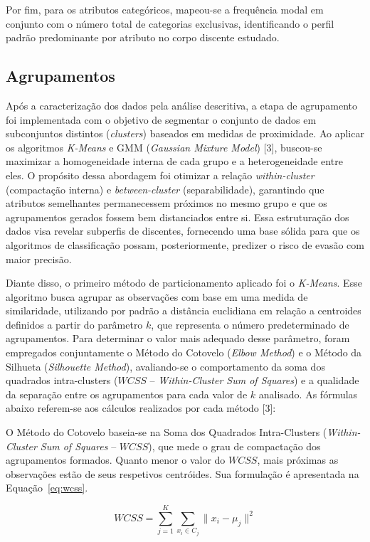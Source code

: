 Por fim, para os atributos categóricos, mapeou-se a frequência modal em conjunto com o número total de categorias exclusivas, identificando o perfil padrão predominante por atributo no corpo discente estudado.

\subsection{Agrupamentos}
Após a caracterização dos dados pela análise descritiva, a etapa de agrupamento foi implementada com o objetivo de segmentar o conjunto de dados em subconjuntos distintos (\textit{clusters}) baseados em medidas de proximidade. Ao aplicar os algoritmos \textit{K-Means} e GMM (\textit{Gaussian Mixture Model}) [3], buscou-se maximizar a homogeneidade interna de cada grupo e a heterogeneidade entre eles. O propósito dessa abordagem foi otimizar a relação \textit{within-cluster} (compactação interna) e \textit{between-cluster} (separabilidade), garantindo que atributos semelhantes permanecessem próximos no mesmo grupo e que os agrupamentos gerados fossem bem distanciados entre si. Essa estruturação dos dados visa revelar subperfis de discentes, fornecendo uma base sólida para que os algoritmos de classificação possam, posteriormente, predizer o risco de evasão com maior precisão.

Diante disso, o primeiro método de particionamento aplicado foi o \textit{K-Means}. Esse algoritmo busca agrupar as observações com base em uma medida de similaridade, utilizando por padrão a distância euclidiana em relação a centroides definidos a partir do parâmetro $k$, que representa o número predeterminado de agrupamentos. Para determinar o valor mais adequado desse parâmetro, foram empregados conjuntamente o Método do Cotovelo (\textit{Elbow Method}) e o Método da Silhueta (\textit{Silhouette Method}), avaliando-se o comportamento da soma dos quadrados intra-clusters ($WCSS$ -- \textit{Within-Cluster Sum of Squares}) e a qualidade da separação entre os agrupamentos para cada valor de $k$ analisado. As fórmulas abaixo referem-se aos cálculos realizados por cada método [3]:

O Método do Cotovelo baseia-se na Soma dos Quadrados Intra-Clusters (\textit{Within-Cluster Sum of Squares} -- $WCSS$), que mede o grau de compactação dos agrupamentos formados. Quanto menor o valor do $WCSS$, mais próximas as observações estão de seus respetivos centróides. Sua formulação é apresentada na Equação~\ref{eq:wcss}.

\begin{equation}
\label{eq:wcss}
WCSS = \sum_{j=1}^{K} \sum_{x_i \in C_j} \|x_i - \mu_j\|^2
\end{equation}

